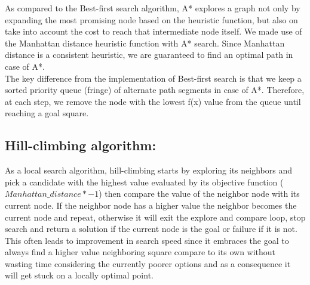 \documentclass[a4paper]{article}
\begin{document}
\noindent As compared to the Best-first search algorithm, A* explores a graph not only by expanding the most promising node based on the heuristic function, but also on take into account the cost to reach that intermediate node itself. We made use of the Manhattan distance heuristic function with A* search. Since Manhattan distance is a consistent heuristic, we are guaranteed to find an optimal path in case of A*. \\

\noindent The key difference from the implementation of Best-first search is that we keep a sorted priority queue (fringe) of alternate path segments in case of A*. Therefore, at each step, we remove the node with the lowest f(x) value from the queue until reaching a goal square.


\subsection{Hill-climbing algorithm:}

As a local search algorithm, hill-climbing starts by exploring its neighbors and pick a candidate with the highest value evaluated by its objective function ($Manhattan\_distance * -1$) then compare the value of the neighbor node with its current node. If the neighbor node has a higher value the neighbor becomes the current node and repeat, otherwise it will exit the explore and compare loop, stop search and return a solution if the current node is the goal or failure if it is not. This often leads to improvement in search speed since it embraces the goal to always find a higher value neighboring square compare to its own without wasting time considering the currently poorer options and as a consequence it will get stuck on a locally optimal point. \\
\end{document}
